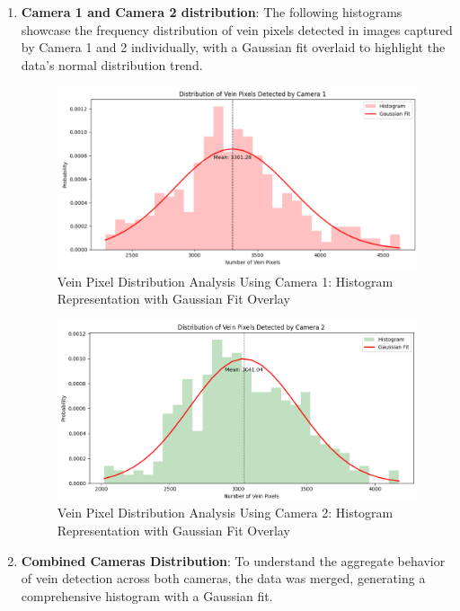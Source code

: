 \begin{enumerate}
    \item \textbf{Camera 1 and Camera 2 distribution}: The following histograms showcase the frequency distribution of vein pixels detected in images captured by Camera 1 and 2 individually, with a Gaussian fit overlaid to highlight the data's normal distribution trend.

    \begin{figure}[H]
        \centering
        \includegraphics[width=1\linewidth]{latex-img/distribution_veins_cam1.png}
        \caption{Vein Pixel Distribution Analysis Using Camera 1: Histogram Representation with Gaussian Fit Overlay}
        \label{distribution_veins_cam1}
    \end{figure}

    \begin{figure}[H]
        \centering
        \includegraphics[width=1\linewidth]{latex-img/distribution_veins_cam2.png}
        \caption{Vein Pixel Distribution Analysis Using Camera 2: Histogram Representation with Gaussian Fit Overlay}
        \label{distribution_veins_cam2}
    \end{figure}
 
    \newpage
    \item \textbf{Combined Cameras Distribution}: To understand the aggregate behavior of vein detection across both cameras, the data was merged, generating a comprehensive histogram with a Gaussian fit.


\end{enumerate}

